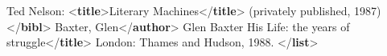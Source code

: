 \begin{shaded}
\hspace*{1em}\mbox{}\newline 
{}\mbox{}\newline 
{}\mbox{}\newline 
\hspace*{1em}Ted Nelson: {<\textbf{title}>}Literary Machines{</\textbf{title}>}\mbox{}\newline 
\hspace*{1em}\hspace*{1em}\hspace*{1em}\hspace*{1em} (privately published, 1987){</\textbf{bibl}>}\mbox{}\newline 
{}\mbox{}\newline 
{}\mbox{}\newline 
\hspace*{1em}\mbox{}\newline 
\hspace*{1em}\hspace*{1em}Baxter, Glen{</\textbf{author}>}\mbox{}\newline 
\hspace*{1em}\hspace*{1em}Glen Baxter His Life: the years of struggle{</\textbf{title}>}\mbox{}\newline 
\hspace*{1em}\hspace*{1em}\hspace*{1em}\hspace*{1em} London: Thames and Hudson, 1988.\mbox{}\newline 
\hspace*{1em}\mbox{}\newline 
{}\mbox{}\newline 
{</\textbf{list}>}\end{shaded}\egroup\par 
